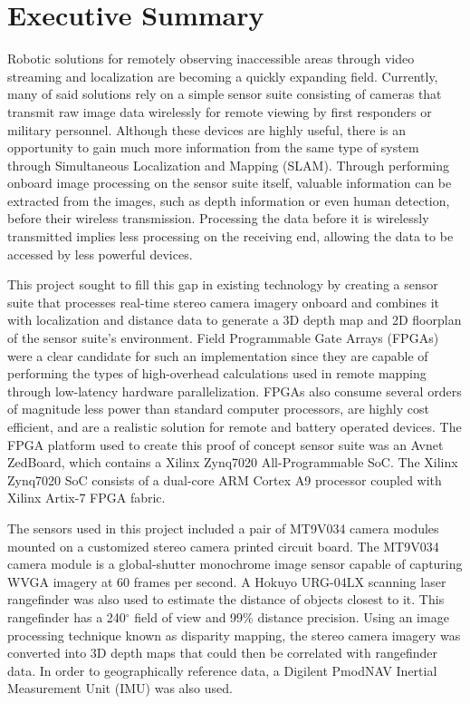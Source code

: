 {}
\section*{Executive Summary}

Robotic solutions for remotely observing inaccessible areas through video streaming and localization are becoming a quickly expanding field. Currently, many of said solutions rely on a simple sensor suite consisting of cameras that transmit raw image data wirelessly for remote viewing by first responders or military personnel. Although these devices are highly useful, there is an opportunity to gain much more information from the same type of system through Simultaneous Localization and Mapping (SLAM). Through performing onboard image processing on the sensor suite itself, valuable information can be extracted from the images, such as depth information or even human detection, before their wireless transmission. Processing the data before it is wirelessly transmitted implies less processing on the receiving end, allowing the data to be accessed by less powerful devices.
\par
This project sought to fill this gap in existing technology by creating a sensor suite that processes real-time stereo camera imagery onboard and combines it with localization and distance data to generate a 3D depth map and 2D floorplan of the sensor suite's environment. Field Programmable Gate Arrays (FPGAs) were a clear candidate for such an implementation since they are capable of performing the types of high-overhead calculations used in remote mapping through low-latency hardware parallelization. FPGAs also consume several orders of magnitude less power than standard computer processors, are highly cost efficient, and are a realistic solution for remote and battery operated devices. The FPGA platform used to create this proof of concept sensor suite was an Avnet ZedBoard, which contains a Xilinx Zynq7020 All-Programmable SoC. The Xilinx Zynq7020 SoC consists of a dual-core ARM Cortex A9 processor coupled with Xilinx Artix-7 FPGA fabric.
\par
The sensors used in this project included a pair of MT9V034 camera modules mounted on a customized stereo camera printed circuit board. The MT9V034 camera module is a global-shutter monochrome image sensor capable of capturing WVGA imagery at 60 frames per second. A Hokuyo URG-04LX scanning laser rangefinder was also used to estimate the distance of objects closest to it. This rangefinder has a 240$^\circ$ field of view and 99\% distance precision. Using an image processing technique known as disparity mapping, the stereo camera imagery was converted into 3D depth maps that could then be correlated with rangefinder data. In order to geographically reference data, a Digilent PmodNAV Inertial Measurement Unit (IMU) was also used. 
